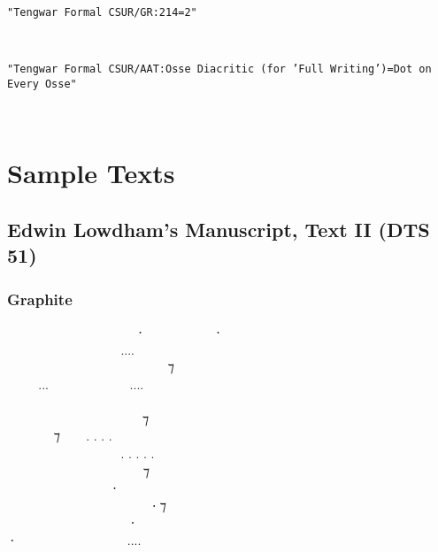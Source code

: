 \documentclass[11pt,a4paper]{article}
\begin{document}
\texttt{"Tengwar Formal CSUR/GR:214=2"}

\formalGRosseevery  

\noindent \texttt{"Tengwar Formal CSUR/AAT:Osse Diacritic (for 'Full Writing')=Dot on Every Osse"}

\formalAATosseevery  



\newpage



\section{Sample Texts}


\subsection{Edwin Lowdham’s Manuscript, Text II (DTS 51)}

\subsubsection*{Graphite}

\formalGR

  ‍   ⸱‍  ‍ ⸱ \\
    ‍....  ‍  \\
  ‍   ‍ ‍ ⁊ ‍  \\
...  ....   \\
         ‍ \\
 ‍ ‍‍   ⁊  ‍ ‍ \\
 ‍ ⁊  . . . .  ‍ ‍‍   \\
   ‍ . . . . . ‍ ‍   \\
      ⁊    \\
   ‍⸱‍   ‍  \\
     ‍⸱ ⁊  ‍ \\
    ⸱    \\
⸱  ‍  .... ‍‍    \\
\end{document}
